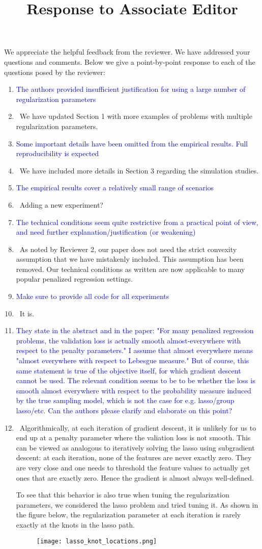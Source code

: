 \documentclass[]{article}
\title{Response to Associate Editor}
\newcommand{\point}[1]{\item \textcolor{blue}{#1}}
\newcommand{\reply}{\item[]\ }
\begin{document}
	\maketitle
		
	We appreciate the helpful feedback from the reviewer. We have addressed your questions and comments. Below we give a point-by-point response to each of the questions posed by the reviewer:
		
	\begin{enumerate}
		\point{The authors provided insufficient justification for using a large number of regularization parameters}
		\reply We have updated Section 1 with more examples of problems with multiple regularization parameters.
		\point{Some important details have been omitted from the empirical results. Full reproducibility is expected}
		\reply We have included more details in Section 3 regarding the simulation studies.
		\point{The empirical results cover a relatively small range of scenarios}
		\reply Adding a new experiment?
		\point{The technical conditions seem quite restrictive from a practical point of view, and need further explanation/justification (or weakening)}
		\reply As noted by Reviewer 2, our paper does not need the strict convexity assumption that we have mistakenly included. This assumption has been removed. Our technical conditions as written are now applicable to many popular penalized regression settings.
		\point{Make sure to provide all code for all experiments}
		\reply It is.
		\point{They state in the abstract and in the paper: "For many penalized regression problems, the validation loss is actually smooth almost-everywhere with respect to the penalty parameters."  I assume that almost everywhere means "almost everywhere with respect to Lebesgue measure."  But of course, this same statement is true of the objective itself, for which gradient descent cannot be used.  The relevant condition seems to be to be whether the loss is smooth almost everywhere with respect to the probability measure induced by the true sampling model, which is not the case for e.g. lasso/group lasso/etc.  Can the authors please clarify and elaborate on this point?}
		\reply Algorithmically, at each iteration of gradient descent, it is unlikely for us to end up at a penalty parameter where the valiation loss is not smooth. This can be viewed as analogous to iteratively solving the lasso using subgradient descent: at each iteration, none of the features are never exactly zero. They are very close and one needs to threshold the feature values to actually get ones that are exactly zero. Hence the gradient is almost always well-defined.
		
		To see that this behavior is also true when tuning the regularization parameters, we considered the lasso problem and tried tuning it. As shown in the figure below, the regularization parameter at each iteration is rarely exactly at the knots in the lasso path.
		
		\begin{figure}
			\centering
			\texttt{[image: lasso\_knot\_locations.png]}
		\end{figure}
	\end{enumerate}
\end{document}
